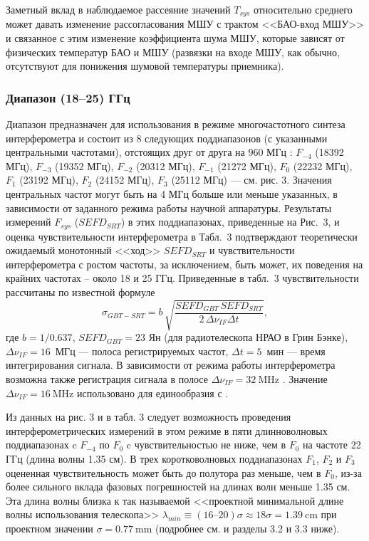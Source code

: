 Заметный вклад в наблюдаемое рассеяние значений $T_{sys}$ относительно среднего может давать
изменение рассогласования МШУ с трактом <<БАО-вход МШУ>> и связанное с этим изменение коэффициента
шума МШУ, которые зависят от физических температур БАО и МШУ (развязки на входе МШУ, как обычно,
отсутствуют для понижения шумовой температуры приемника).

\subsubsection{Диапазон (18--25) ГГц}

Диапазон предназначен для использования в режиме многочастотного синтеза интерферометра и состоит из
8 следующих поддиапазонов (с указанными центральными частотами), отстоящих друг от друга на 960 МГц
\cite{Kardashev_2013_rus}: $F_{-4}$ (18392 МГц), $F_{-3}$ (19352 МГц), $F_{-2}$ (20312 МГц),
$F_{-1}$ (21272 МГц), $F_0$ (22232 МГц), $F_1$ (23192 МГц),  $F_2$ (24152 МГц), $F_3$ (25112 МГц)
--- см. рис. 3. Значения центральных частот могут быть на 4 МГц больше или меньше указанных, в
зависимости от заданного режима работы научной аппаратуры. Результаты измерений $F_{sys}$
($SEFD_{SRT}$) в этих поддиапазонах, приведенные на Рис.~3, и оценка чувствительности интерферометра
в Табл.~3 подтверждают теоретически ожидаемый монотонный <<ход>> $SEFD_{SRT}$ и чувствительности
интерферометра с ростом частоты, за исключением, быть может, их поведения на крайних частотах --
около 18 и 25 ГГц. Приведенные в табл.~3 чувствительности  рассчитаны по известной формуле
\cite{Kardashev_2013_rus}
$$
\sigma_{GBT-SRT} = b\, \sqrt{\frac {SEFD_{GBT}\, SEFD_{SRT}}{2\, \Delta \nu_{IF} \Delta t}},
$$
\noindent
где $b = 1/0.637$, $SEFD_{GBT} = 23$ Ян (для радиотелескопа НРАО в Грин Бэнке),
$\Delta \nu_{IF} = 16$~МГц --- полоса регистрируемых частот, $\Delta t = 5$~мин ---
время интегрирования сигнала. В зависимости от режима
работы интерферометра возможна также регистрация сигнала в полосе $\Delta\nu_{IF} = \SI{32}{\MHz}$
\cite{Kardashev_2013_rus}. Значение $\Delta\nu_{IF} = \SI{16}{\MHz}$ использовано для единообразия с
\cite{RAUH}.

Из данных на рис. 3 и в табл. 3 следует возможность проведения интерферометрических измерений в этом
режиме в пяти длинноволновых поддиапазонах c $F_{-4}$ по $F_0$ c чувствительностью не ниже, чем в
$F_0$ на частоте 22 ГГц (длина волны 1.35 см). В трех коротковолновых поддиапазонах $F_1$, $F_2$ и
$F_3$ оцененная чувствительность может быть до полутора раз меньше, чем в $F_0$, из-за более
сильного вклада фазовых погрешностей на длинах волн меньше 1.35 см. Эта длина волны близка к так
называемой <<проектной минимальной длине волны использования телескопа>> $\lambda_{min} \equiv
(16\text{--}20)\sigma \approx 18\sigma= \SI{1.39}{\cm}$ при проектном значении $\sigma =
\SI{0.77}{\mm}$ (подробнее см. \cite{Esepkina_1973,Kuhn_1967,Cejtlin_1976} и разделы 3.2 и 3.3
ниже).

